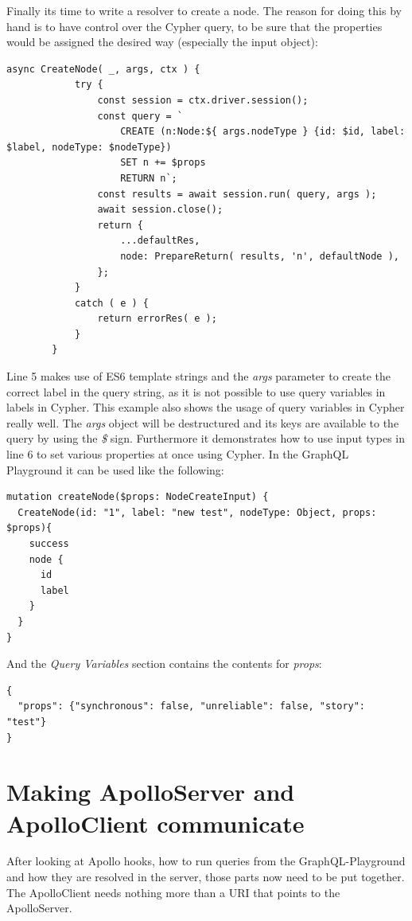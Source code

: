 \newpage
Finally its time to write a resolver to create a node. The reason for doing this by hand is to have control over the Cypher query, to be sure that the properties would be assigned the desired way (especially the input object):
\lstset{language=JavaScript}
\begin{lstlisting}[caption={Using returned Values from the Query}]
		async CreateNode( _, args, ctx ) {
			try {
				const session = ctx.driver.session();
				const query = `
					CREATE (n:Node:${ args.nodeType } {id: $id, label: $label, nodeType: $nodeType})
					SET n += $props
					RETURN n`;
				const results = await session.run( query, args );
				await session.close();
				return {
					...defaultRes,
					node: PrepareReturn( results, 'n', defaultNode ),
				};
			}
			catch ( e ) {
				return errorRes( e );
			}
		}
\end{lstlisting}
Line 5 makes use of ES6 template strings and the \emph{args} parameter to create the correct label in the query string, as it is not possible to use query variables in labels in Cypher. This example also shows the usage of query variables in Cypher really well. The \emph{args} object will be destructured and its keys are available to the query by using the \emph{\$} sign. Furthermore it demonstrates how to use input types in line 6 to set various properties at once using Cypher. In the GraphQL Playground it can be used like the following:
\lstset{language=GraphQL}
\begin{lstlisting}[caption={Using the Create Node resolver},label={ex:RunCreateNode}]
mutation createNode($props: NodeCreateInput) {
  CreateNode(id: "1", label: "new test", nodeType: Object, props: $props){
    success
    node {
      id
      label
    }
  }
}
\end{lstlisting}

And the \emph{Query Variables} section contains the contents for \emph{props}:
\begin{lstlisting}[caption={Query Variables}]
{
  "props": {"synchronous": false, "unreliable": false, "story": "test"}
}
\end{lstlisting}

\section{Making ApolloServer and ApolloClient communicate}
After looking at Apollo hooks, how to run queries from the GraphQL-Playground and how they are resolved in the server, those parts now need to be put together. The ApolloClient needs nothing more than a URI that points to the ApolloServer.

